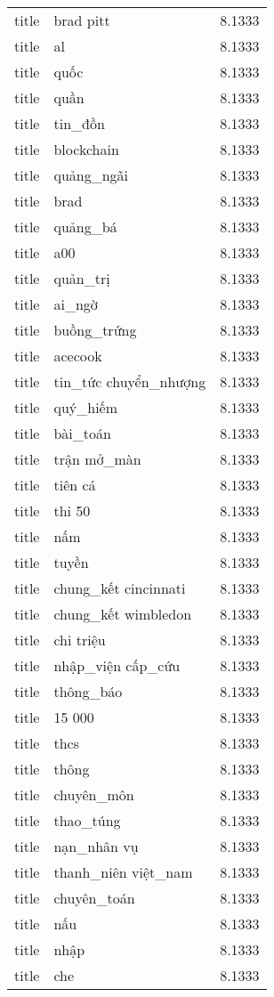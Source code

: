 \documentclass{article}
\begin{document}
\begin{tabular}{lll}
title & brad pitt & 8.1333\\
title & al & 8.1333\\
title & quốc & 8.1333\\
title & quần & 8.1333\\
title & tin\_đồn & 8.1333\\
title & blockchain & 8.1333\\
title & quảng\_ngãi & 8.1333\\
title & brad & 8.1333\\
title & quảng\_bá & 8.1333\\
title & a00 & 8.1333\\
title & quản\_trị & 8.1333\\
title & ai\_ngờ & 8.1333\\
title & buồng\_trứng & 8.1333\\
title & acecook & 8.1333\\
title & tin\_tức chuyển\_nhượng & 8.1333\\
title & quý\_hiếm & 8.1333\\
title & bài\_toán & 8.1333\\
title & trận mở\_màn & 8.1333\\
title & tiên cá & 8.1333\\
title & thi 50 & 8.1333\\
title & nấm & 8.1333\\
title & tuyền & 8.1333\\
title & chung\_kết cincinnati & 8.1333\\
title & chung\_kết wimbledon & 8.1333\\
title & chi triệu & 8.1333\\
title & nhập\_viện cấp\_cứu & 8.1333\\
title & thông\_báo & 8.1333\\
title & 15 000 & 8.1333\\
title & thcs & 8.1333\\
title & thông & 8.1333\\
title & chuyên\_môn & 8.1333\\
title & thao\_túng & 8.1333\\
title & nạn\_nhân vụ & 8.1333\\
title & thanh\_niên việt\_nam & 8.1333\\
title & chuyên\_toán & 8.1333\\
title & nấu & 8.1333\\
title & nhập & 8.1333\\
title & che & 8.1333\\

\end{tabular}
\end{document}
